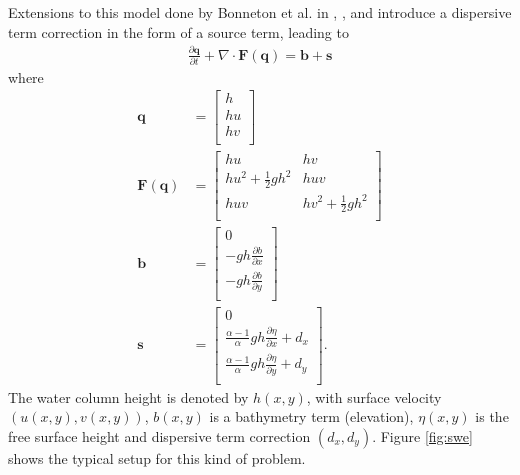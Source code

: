 Extensions to this model done by Bonneton et al. in \citep{bonneton2011splitting}, \citep{lannes2009derivation}, and \citep{lannes2015new} introduce a dispersive term correction in the form of a source term, leading to
\begin{align}
    \frac{\partial \textbf{q}}{\partial t} + \nabla \cdot \textbf{F}(\textbf{q}) = \textbf{b} + \textbf{s}
\end{align}
where
\begin{align}
    \textbf{q} &=
    \begin{bmatrix}
        h \\
        h u \\
        h v \\
    \end{bmatrix} \\
    \textbf{F}(\textbf{q}) &=
    \begin{bmatrix}
        h u & h v \\
        h u^2 + \frac{1}{2} gh^2 & h u v \\
        h u v & h v^2 + \frac{1}{2} gh^2 \\
    \end{bmatrix} \\
    \textbf{b} &=
    \begin{bmatrix}
        0 \\
        -g h \frac{\partial b}{\partial x} \\
        -g h \frac{\partial b}{\partial y} \\
    \end{bmatrix} \\
    \textbf{s} &=
    \begin{bmatrix}
        0 \\
        \frac{\alpha - 1}{\alpha} g h \frac{\partial \eta}{\partial x} + d_x \\
        \frac{\alpha - 1}{\alpha} g h \frac{\partial \eta}{\partial y} + d_y \\
    \end{bmatrix}.
\end{align}
The water column height is denoted by $h(x,y)$, with surface velocity $(u(x,y), v(x,y))$, $b(x,y)$ is a bathymetry term (elevation), $\eta(x,y)$ is the free surface height and dispersive term correction $(d_x, d_y)$. Figure \ref{fig:swe} shows the typical setup for this kind of problem.

